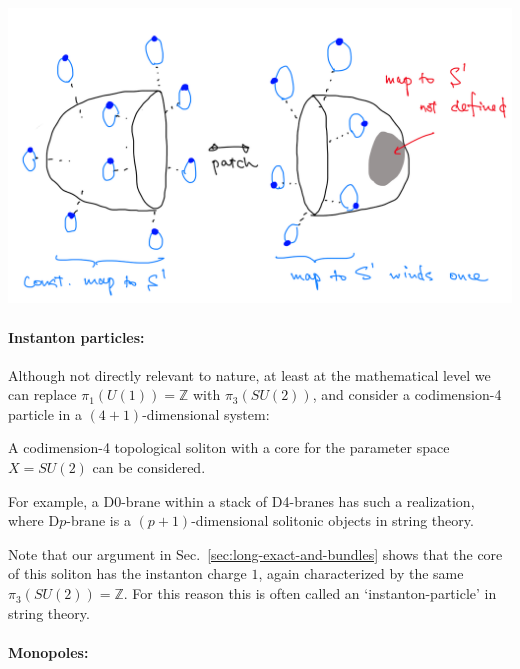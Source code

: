 \documentclass[12pt]{article}
\numberwithin{equation}{section}
\numberwithin{figure}{section}
\theoremstyle{remark}
\renewenvironment{figure}[1][]{
  \begin{originalfigure}[#1]
    \begin{mdframed}[linecolor=black!0,backgroundcolor=black!1]
}{
    \end{mdframed}
  \end{originalfigure}
}
\def\bZ{\mathbb{Z}}
\begin{document}
\begin{figure}[h]
\centering
\includegraphics[width=.8\textwidth]{vortex-flux.png}
\caption{To measure the magnetic flux, we can put a vortex configuration on $S^2$.
This requires a nontrivial gauge transformation around the equator.}
\label{fig:vortex-flux}
\end{figure}


\paragraph{Instanton particles:}

Although not directly relevant to nature,
at least at the mathematical level we can replace $\pi_1(U(1))=\bZ$ with $\pi_3(SU(2))$,
and consider a codimension-4 particle in a $(4+1)$-dimensional system:
\begin{example}
A codimension-4 topological soliton with a core for the parameter space $X=SU(2)$
can be considered.
\end{example}
For example, a D0-brane within a stack of D4-branes has such a realization,
where D$p$-brane is a $(p+1)$-dimensional solitonic objects in string theory.

Note that our argument in Sec.~\ref{sec:long-exact-and-bundles} 
shows that the core of this soliton has the instanton charge $1$, 
again characterized by the same $\pi_3(SU(2))=\bZ$.
For this reason this is often called an `instanton-particle' in string theory.

\paragraph{Monopoles:}
\end{document}
